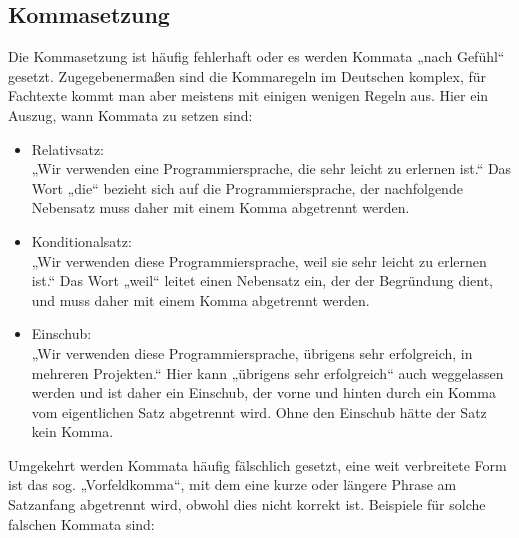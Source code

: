 \subsection{Kommasetzung}

Die Kommasetzung ist häufig fehlerhaft oder es werden Kommata „nach Gefühl“ gesetzt. Zugegebenermaßen sind die Kommaregeln im Deutschen komplex, für Fachtexte kommt man aber meistens mit einigen wenigen Regeln aus. Hier ein Auszug, wann Kommata zu setzen sind:

\begin{itemize}
    \item Relativsatz: \\
    „Wir verwenden eine Programmiersprache, die sehr leicht zu erlernen ist.“ Das Wort „die“ bezieht sich auf die Programmiersprache, der nachfolgende Nebensatz muss daher mit einem Komma abgetrennt werden.

    \item Konditionalsatz: \\
    „Wir verwenden diese Programmiersprache, weil sie sehr leicht zu erlernen ist.“ Das Wort „weil“ leitet einen Nebensatz ein, der der Begründung dient, und muss daher mit einem Komma abgetrennt werden.

    \item Einschub: \\
    „Wir verwenden diese Programmiersprache, übrigens sehr erfolgreich, in mehreren Projekten.“ Hier kann „übrigens sehr erfolgreich“ auch weggelassen werden und ist daher ein Einschub, der vorne und hinten durch ein Komma vom eigentlichen Satz abgetrennt wird. Ohne den Einschub hätte der Satz kein Komma.
\end{itemize}

Umgekehrt werden Kommata häufig fälschlich gesetzt, eine weit verbreitete Form ist das sog. „Vorfeldkomma“, mit dem eine kurze oder längere Phrase am Satzanfang abgetrennt wird, obwohl dies nicht korrekt ist. Beispiele für solche falschen Kommata sind:

